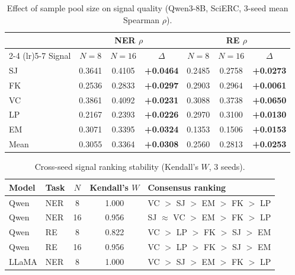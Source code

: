
\begin{table}[t]
\centering
\caption{Effect of sample pool size on signal quality (Qwen3-8B, SciERC, 3-seed mean Spearman $\rho$).}
\label{tab:n-scaling}
\small
\begin{tabular}{l ccc ccc}
\toprule
 & \multicolumn{3}{c}{\textbf{NER} $\rho$} & \multicolumn{3}{c}{\textbf{RE} $\rho$} \\
\cmidrule(lr){2-4} \cmidrule(lr){5-7}
Signal & $N\!=\!8$ & $N\!=\!16$ & $\Delta$ & $N\!=\!8$ & $N\!=\!16$ & $\Delta$ \\
\midrule
SJ & 0.3641 & 0.4105 & \textbf{+0.0464} & 0.2485 & 0.2758 & \textbf{+0.0273} \\
FK & 0.2536 & 0.2833 & \textbf{+0.0297} & 0.2903 & 0.2964 & \textbf{+0.0061} \\
VC & 0.3861 & 0.4092 & \textbf{+0.0231} & 0.3088 & 0.3738 & \textbf{+0.0650} \\
LP & 0.2167 & 0.2393 & \textbf{+0.0226} & 0.2970 & 0.3100 & \textbf{+0.0130} \\
EM & 0.3071 & 0.3395 & \textbf{+0.0324} & 0.1353 & 0.1506 & \textbf{+0.0153} \\
\midrule
Mean & 0.3055 & 0.3364 & \textbf{+0.0308} & 0.2560 & 0.2813 & \textbf{+0.0253} \\
\bottomrule
\end{tabular}
\end{table}

\begin{table}[t]
\centering
\caption{Cross-seed signal ranking stability (Kendall's $W$, 3 seeds).}
\label{tab:ranking-stability}
\small
\begin{tabular}{ll cc l}
\toprule
Model & Task & $N$ & Kendall's $W$ & Consensus ranking \\
\midrule
Qwen  & NER & 8  & 1.000 & VC $>$ SJ $>$ EM $>$ FK $>$ LP \\
Qwen  & NER & 16 & 0.956 & SJ $\approx$ VC $>$ EM $>$ FK $>$ LP \\
Qwen  & RE  & 8  & 0.822 & VC $>$ LP $>$ FK $>$ SJ $>$ EM \\
Qwen  & RE  & 16 & 0.956 & VC $>$ LP $>$ FK $>$ SJ $>$ EM \\
LLaMA & NER & 8  & 1.000 & VC $>$ SJ $>$ EM $>$ FK $>$ LP \\
\bottomrule
\end{tabular}
\end{table}

